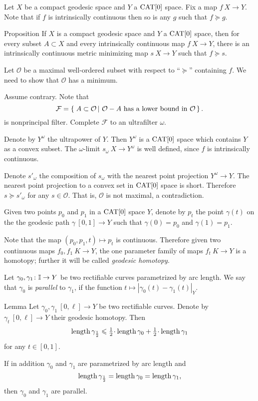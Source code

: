 \documentclass{article}
\begin{document}
Let $X$ be a compact geodesic space and $Y$ a $\mathop{\rm CAT}\nolimits[0]$ space. 
Fix a map $f\:X\to Y$.
Note that if $f$ is intrinsically continuous then so is any $g$ such that $f\succcurlyeq g$.

\begin{thm}{Proposition}\label{prop:exist}
If $X$ is a compact geodesic space and $Y$ a $\mathop{\rm CAT}\nolimits[0]$ space, then for every subset $A\subset X$ and every intrinsically continuous map $f\:X\rightarrow Y$,
there is an intrinsically continuous  metric minimizing map $s\:X\rightarrow Y$
such that $f\succcurlyeq s$.
\end{thm}

Let $\mathcal{O}$ be a maximal well-ordered subset with respect to ``$\succcurlyeq$'' containing $f$. 
We need to show that $\mathcal{O}$ has a minimum.

Assume contrary.
Note that
$$
\mathcal{F}
=
\set{A\subset\mathcal{O}}{\mathcal{O}-A\text{ has a lower bound in }\mathcal{O}}.
$$
is nonprincipal filter.
Complete $\mathcal{F}$ to an ultrafilter $\omega$. 

Denote by $Y^\omega$ the ultrapower of $Y$. 
Then $Y^\omega$
is a $\mathop{\rm CAT}\nolimits[0]$ space which contains $Y$ as a convex subset. 
The $\omega$-limit $s_\omega\:X\to Y^\omega$ is well defined, since
$f$ is intrinsically continuous. 

Denote $s'_\omega$ the composition of $s_\omega$ with the nearest point projection $Y^\omega\to Y$.
The nearest point projection to a convex set in $\mathop{\rm CAT}\nolimits[0]$ space is short.
Therefore $s\succcurlyeq s'_\omega$ for any $s\in \mathcal{O}$.
That is, $\mathcal{O}$ is not maximal, a contradiction.
\qeds

Given two points $p_0$ and $p_1$ in a $\mathop{\rm CAT}\nolimits[0]$ space $Y$,
denote by $p_t$ the point $\gamma(t)$ on the 
the geodesic path $\gamma\:[0,1]\to Y$ such that $\gamma(0)=p_0$ and $\gamma(1)=p_1$.

Note that the map $(p_0,p_1,t)\mapsto p_t$ is continuous.
Therefore given two continuous maps $f_0,f_1\:K\to Y$,
the one parameter family of maps $f_t\:K\to Y$ is a homotopy;
further it will be called \emph{geodesic homotopy}.

Let $\gamma_{0}, \gamma_1\colon\mathbb{I}\to Y$ be two rectifiable curves parametrized by arc length. 
We say that  $\gamma_{0}$ is {\em parallel} to $\gamma_{1}$, if the function $t\mapsto |\gamma_{0}(t)-\gamma_{1}(t)|_Y$.


\begin{thm}{Lemma}\label{lem:parpaths}
Let $\gamma_0,\gamma_1\:[0,\ell]\to Y$ be two rectifiable curves. 
Denote by $\gamma_t\:[0,\ell]\to Y$ their geodesic homotopy.
Then
\[\length\gamma_{\frac12}
\le \tfrac12\cdot\length\gamma_0 +\tfrac12\cdot\length\gamma_1\]
for any $t\in [0,1]$.

If in addition $\gamma_0$ and $\gamma_1$ are parametrized by arc length and 
\[\mathop{\rm length}\nolimits\gamma_{\frac12}
=\mathop{\rm length}\nolimits\gamma_0
=\mathop{\rm length}\nolimits\gamma_1,\] 
then $\gamma_{0}$ and $\gamma_{1}$ are parallel. 
\end{thm}
\end{document}

